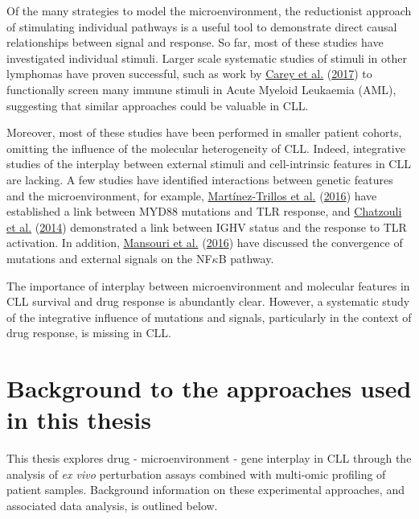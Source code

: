 \documentclass[11pt, a4paper, twosided]{book}
\begin{document}
Of the many strategies to model the microenvironment, the reductionist approach of stimulating individual pathways is a useful tool to demonstrate direct causal relationships between signal and response. So far, most of these studies have investigated individual stimuli. Larger scale systematic studies of stimuli in other lymphomas have proven successful, such as work by \protect\hyperlink{ref-Carey2017}{Carey et al.} (\protect\hyperlink{ref-Carey2017}{2017}) to functionally screen many immune stimuli in Acute Myeloid Leukaemia (AML), suggesting that similar approaches could be valuable in CLL.

Moreover, most of these studies have been performed in smaller patient cohorts, omitting the influence of the molecular heterogeneity of CLL. Indeed, integrative studies of the interplay between external stimuli and cell-intrinsic features in CLL are lacking. A few studies have identified interactions between genetic features and the microenvironment, for example, \protect\hyperlink{ref-Martinez2016}{Martínez-Trillos et al.} (\protect\hyperlink{ref-Martinez2016}{2016}) have established a link between MYD88 mutations and TLR response, and \protect\hyperlink{ref-Chatzouli2014}{Chatzouli et al.} (\protect\hyperlink{ref-Chatzouli2014}{2014}) demonstrated a link between IGHV status and the response to TLR activation. In addition, \protect\hyperlink{ref-Mansouri2016}{Mansouri et al.} (\protect\hyperlink{ref-Mansouri2016}{2016}) have discussed the convergence of mutations and external signals on the NF\(\kappa\)B pathway.

The importance of interplay between microenvironment and molecular features in CLL survival and drug response is abundantly clear. However, a systematic study of the integrative influence of mutations and signals, particularly in the context of drug response, is missing in CLL.

\hypertarget{background-approaches-intro}{%
\section{Background to the approaches used in this thesis}\label{background-approaches-intro}}

This thesis explores drug - microenvironment - gene interplay in CLL through the analysis of \emph{ex vivo} perturbation assays combined with multi-omic profiling of patient samples. Background information on these experimental approaches, and associated data analysis, is outlined below.
\end{document}
